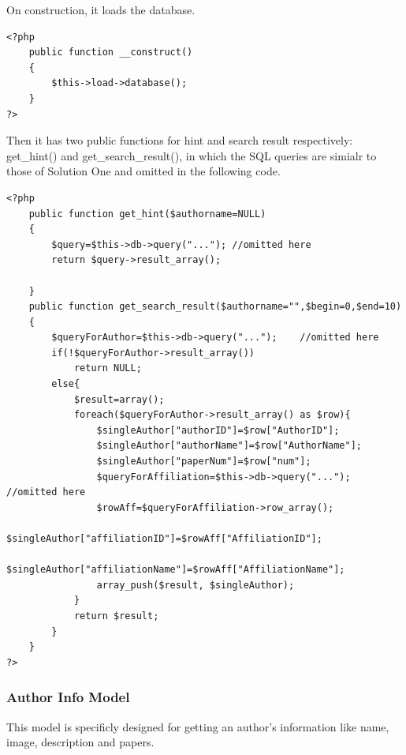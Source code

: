 \documentclass[a4paper]{article}
\begin{document}
On construction, it loads the database.
                \begin{verbatim}
<?php
    public function __construct()
    {
        $this->load->database();
    }
?>
                \end{verbatim}
Then it has two public functions for hint and search result respectively: get\_hint() and get\_search\_result(), in which the SQL queries are simialr to those of Solution One and omitted in the following code.
                \begin{verbatim}
<?php
    public function get_hint($authorname=NULL)
    {
        $query=$this->db->query("..."); //omitted here
        return $query->result_array();

    }
    public function get_search_result($authorname="",$begin=0,$end=10)
    {
        $queryForAuthor=$this->db->query("...");    //omitted here
        if(!$queryForAuthor->result_array())
            return NULL;
        else{
            $result=array();
            foreach($queryForAuthor->result_array() as $row){
                $singleAuthor["authorID"]=$row["AuthorID"];
                $singleAuthor["authorName"]=$row["AuthorName"];
                $singleAuthor["paperNum"]=$row["num"];
                $queryForAffiliation=$this->db->query("...");   //omitted here
                $rowAff=$queryForAffiliation->row_array();
                $singleAuthor["affiliationID"]=$rowAff["AffiliationID"];
                $singleAuthor["affiliationName"]=$rowAff["AffiliationName"];
                array_push($result, $singleAuthor);
            }
            return $result;
        }
    }
?>
                \end{verbatim}
            \subsubsection{Author Info Model}
This model is specificly designed for getting an author's information like name, image, description and papers.
\end{document}
